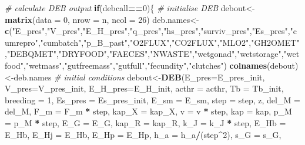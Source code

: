 \documentclass[]{article}
\newenvironment{Shaded}{\begin{snugshade}}{\end{snugshade}}
\newcommand{\KeywordTok}[1]{\textcolor[rgb]{0.13,0.29,0.53}{\textbf{#1}}}
\newcommand{\DataTypeTok}[1]{\textcolor[rgb]{0.13,0.29,0.53}{#1}}
\newcommand{\DecValTok}[1]{\textcolor[rgb]{0.00,0.00,0.81}{#1}}
\newcommand{\StringTok}[1]{\textcolor[rgb]{0.31,0.60,0.02}{#1}}
\newcommand{\CommentTok}[1]{\textcolor[rgb]{0.56,0.35,0.01}{\textit{#1}}}
\newcommand{\ControlFlowTok}[1]{\textcolor[rgb]{0.13,0.29,0.53}{\textbf{#1}}}
\newcommand{\OperatorTok}[1]{\textcolor[rgb]{0.81,0.36,0.00}{\textbf{#1}}}
\newcommand{\NormalTok}[1]{#1}
\begin{document}
\begin{Shaded}
\begin{Highlighting}[]
\CommentTok{# calculate DEB output }
\ControlFlowTok{if}\NormalTok{(debcall}\OperatorTok{==}\DecValTok{0}\NormalTok{)\{}
    \CommentTok{# initialise DEB}
\NormalTok{    debout<-}\KeywordTok{matrix}\NormalTok{(}\DataTypeTok{data =} \DecValTok{0}\NormalTok{, }\DataTypeTok{nrow =}\NormalTok{ n, }\DataTypeTok{ncol =} \DecValTok{26}\NormalTok{)}
\NormalTok{    deb.names<-}\KeywordTok{c}\NormalTok{(}\StringTok{"E_pres"}\NormalTok{,}\StringTok{"V_pres"}\NormalTok{,}\StringTok{"E_H_pres"}\NormalTok{,}\StringTok{"q_pres"}\NormalTok{,}\StringTok{"hs_pres"}\NormalTok{,}\StringTok{"surviv_pres"}\NormalTok{,}\StringTok{"Es_pres"}\NormalTok{,}\StringTok{"cumrepro"}\NormalTok{,}\StringTok{"cumbatch"}\NormalTok{,}\StringTok{"p_B_past"}\NormalTok{,}\StringTok{"O2FLUX"}\NormalTok{,}\StringTok{"CO2FLUX"}\NormalTok{,}\StringTok{"MLO2"}\NormalTok{,}\StringTok{"GH2OMET"}\NormalTok{,}\StringTok{"DEBQMET"}\NormalTok{,}\StringTok{"DRYFOOD"}\NormalTok{,}\StringTok{"FAECES"}\NormalTok{,}\StringTok{"NWASTE"}\NormalTok{,}\StringTok{"wetgonad"}\NormalTok{,}\StringTok{"wetstorage"}\NormalTok{,}\StringTok{"wetfood"}\NormalTok{,}\StringTok{"wetmass"}\NormalTok{,}\StringTok{"gutfreemass"}\NormalTok{,}\StringTok{"gutfull"}\NormalTok{,}\StringTok{"fecundity"}\NormalTok{,}\StringTok{"clutches"}\NormalTok{)}
    \KeywordTok{colnames}\NormalTok{(debout)<-deb.names}
    \CommentTok{# initial conditions}
\NormalTok{    debout<-}\KeywordTok{DEB}\NormalTok{(}\DataTypeTok{E_pres=}\NormalTok{E_pres_init, }\DataTypeTok{V_pres=}\NormalTok{V_pres_init, }\DataTypeTok{E_H_pres=}\NormalTok{E_H_init, }\DataTypeTok{acthr =}\NormalTok{ acthr, }\DataTypeTok{Tb =}\NormalTok{ Tb_init, }\DataTypeTok{breeding =} \DecValTok{1}\NormalTok{, }\DataTypeTok{Es_pres =}\NormalTok{ Es_pres_init, }\DataTypeTok{E_sm =}\NormalTok{ E_sm, }\DataTypeTok{step =}\NormalTok{ step, z, }\DataTypeTok{del_M =}\NormalTok{ del_M, }\DataTypeTok{F_m =}\NormalTok{ F_m }\OperatorTok{*}\StringTok{ }
\StringTok{    }\NormalTok{step, }\DataTypeTok{kap_X =}\NormalTok{ kap_X, }\DataTypeTok{v =}\NormalTok{ v }\OperatorTok{*}\StringTok{ }\NormalTok{step, }\DataTypeTok{kap =}\NormalTok{ kap, }\DataTypeTok{p_M =}\NormalTok{ p_M }\OperatorTok{*}\StringTok{ }
\StringTok{    }\NormalTok{step, }\DataTypeTok{E_G =}\NormalTok{ E_G, }\DataTypeTok{kap_R =}\NormalTok{ kap_R, }\DataTypeTok{k_J =}\NormalTok{ k_J }\OperatorTok{*}\StringTok{ }\NormalTok{step, }\DataTypeTok{E_Hb =}\NormalTok{ E_Hb, }
    \DataTypeTok{E_Hj =}\NormalTok{ E_Hb, }\DataTypeTok{E_Hp =}\NormalTok{ E_Hp, }\DataTypeTok{h_a =}\NormalTok{ h_a}\OperatorTok{/}\NormalTok{(step}\OperatorTok{^}\DecValTok{2}\NormalTok{), }\DataTypeTok{s_G =}\NormalTok{ s_G, }

\end{Highlighting}
\end{Shaded}
\end{document}
